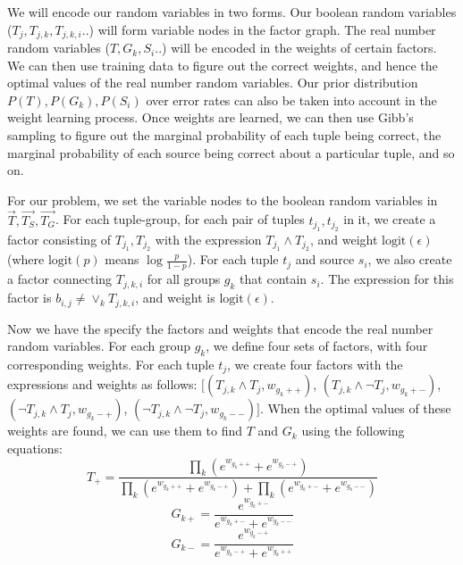 \documentclass{sig-alternate}
\newcounter{prob}
\newcommand{\logit}{\mathrm{logit}}
\begin{document}
We will encode our random variables in two forms. Our boolean random variables ($T_j, T_{j,k}, T_{j,k,i}..$) will form variable nodes in the factor graph. The real number random variables ($T, G_k, S_i..$) will be encoded in the weights of certain factors. We can then use training data to figure out the correct weights, and hence the optimal values of the real number random variables. Our prior distribution $P(T), P(G_k), P(S_i)$ over error rates can also be taken into account in the weight learning process. Once weights are learned, we can then use Gibb's sampling to figure out the marginal probability of each tuple being correct, the marginal probability of each source being correct about a particular tuple, and so on. 

For our problem, we set the variable nodes to the boolean random variables in $\overrightarrow{T}, \overrightarrow{T_S}, \overrightarrow{T_G}$. For each tuple-group, for each pair of tuples $t_{j_1}, t_{j_2}$ in it, we create a factor consisting of $T_{j_1}, T_{j_2}$ with the expression $T_{j_1} \land T_{j_2}$, and weight $\logit(\epsilon)$ (where $\logit(p)$ means $\log\frac{p}{1-p}$). For each tuple $t_j$ and source $s_i$, we also create a factor connecting $T_{j,k,i}$ for all groups $g_k$ that contain $s_i$. The expression for this factor is $b_{i,j} \neq \lor_{k} T_{j,k,i}$, and weight is $\logit(\epsilon)$. 


Now we have the specify the factors and weights that encode the real number random variables. For each group $g_k$, we define four sets of factors, with four corresponding weights. For each tuple $t_j$, we create four factors with the expressions and weights as follows: $[(T_{j,k} \land T_j, w_{g_k++})$, $(T_{j,k} \land \lnot T_j, w_{g_k+-})$, $(\lnot T_{j,k} \land T_j, w_{g_k-+})$, $(\lnot T_{j,k} \land \lnot T_j, w_{g_k--})]$. When the optimal values of these weights are found, we can use them to find $T$ and $G_k$ using the following equations:
$$T_{+} = \frac{\prod_{k} (e^{w_{g_k++}} + e^{w_{g_k-+}})}{\prod_{k} (e^{w_{g_k++}} + e^{w_{g_k-+}}) + \prod_{k} (e^{w_{g_k+-}} + e^{w_{g_k--}})}$$
$$G_{k+} = \frac{e^{w_{g_k+-}}}{e^{w_{g_k+-}} + e^{w_{g_k--}}}$$
$$G_{k-} = \frac{e^{w_{g_k-+}}}{e^{w_{g_k-+}} + e^{w_{g_k++}}}$$
\end{document}
